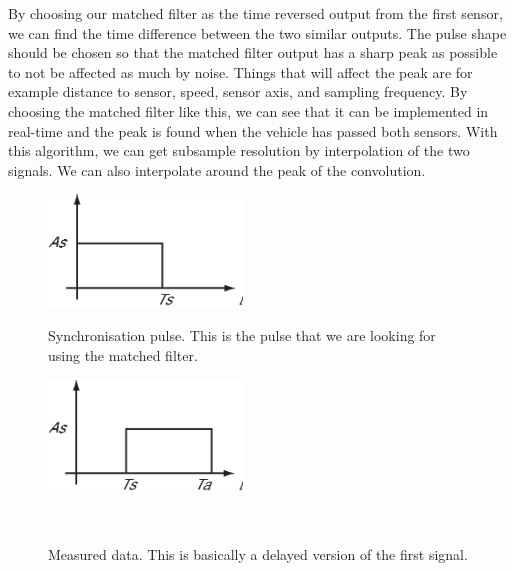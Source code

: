 By choosing our matched filter as the time reversed output from the first sensor, we can find the time difference between the two similar outputs. The pulse shape should be chosen so that the matched filter output has a sharp peak as possible to not be affected as much by noise. Things that will affect the peak are for example distance to sensor, speed, sensor axis, and sampling frequency. By choosing the matched filter like this, we can see that it can be implemented in real-time and the peak is found when the vehicle has passed both sensors. With this algorithm, we can get subsample resolution by interpolation of the two signals. We can also interpolate around the peak of the convolution.

\begin{subfigures}
\begin{figure}[!htb]
  \centering
  \begin{minipage}{0.45\linewidth}
  \centering
   \includegraphics[height=3cm]{images/conv1}
  \caption[Synchronisation pulse]{Synchronisation pulse. This is the pulse that we are looking for using the matched filter.}
  \label{fig-conv1}
  \end{minipage}\hspace{0.5cm}
  \begin{minipage}{0.45\linewidth}
  \centering
   \includegraphics[height=3cm]{images/conv2}
  \caption[Data stream]{Measured data. This is basically a delayed version of the first signal.\\}
  \label{fig-conv2}
  \end{minipage}\\
   \begin{minipage}{0.45\linewidth}

\end{minipage}
\end{figure}
\end{subfigures}
